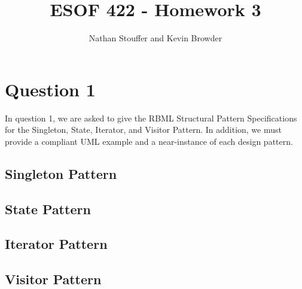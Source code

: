 \documentclass{article}
\begin{document}
	
\title{ESOF 422 - Homework 3}
\author{Nathan Stouffer and Kevin Browder}

\maketitle
\newpage

\section*{Question 1}

In question 1, we are asked to give the RBML Structural Pattern Specifications for the Singleton, State, Iterator, and Visitor Pattern. In addition, we must provide a compliant UML example and a near-instance of each design pattern.

\subsection*{Singleton Pattern}



\subsection*{State Pattern}



\subsection*{Iterator Pattern}



\subsection*{Visitor Pattern}
\end{document}
